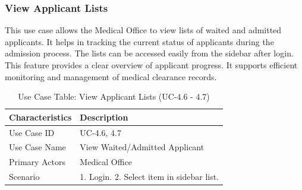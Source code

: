 \subsubsection{View Applicant Lists}
This use case allows the Medical Office to view lists of waited and admitted applicants. It helps in tracking the current status of applicants during the admission process. The lists can be accessed easily from the sidebar after login. This feature provides a clear overview of applicant progress. It supports efficient monitoring and management of medical clearance records.
\begin{table}[H]
    \centering
    \small
    \renewcommand{\arraystretch}{1.4}
    \caption{Use Case Table: View Applicant Lists (UC-4.6 - 4.7)} %
    \label{tab:view-applicant-lists}
    \begin{tabularx}{\textwidth}{|l|X|}
        \hline
        \rowcolor[gray]{0.9} {Characteristics} & {Description} \\ \hline
        Use Case ID & UC-4.6, 4.7 \\ \hline
        Use Case Name & View Waited/Admitted Applicant \\ \hline
        Primary Actors & Medical Office \\ \hline
        Scenario & 1. Login. 2. Select item in sidebar list. \\ \hline
    \end{tabularx}
\end{table}
\FloatBarrier